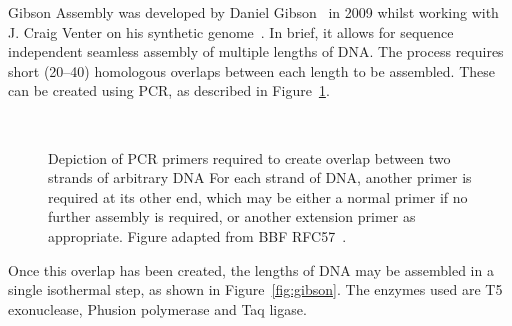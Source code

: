\documentclass[../main.tex]{subfiles}
\begin{document}
Gibson Assembly was developed by Daniel Gibson~\citep{gibson09} in 2009 whilst working with J. Craig Venter on his synthetic genome~\citep{venter10}. In brief, it allows for sequence independent seamless assembly of multiple lengths of DNA. The process requires short (\SIrange{20}{40}{\base}) homologous overlaps between each length to be assembled. These can be created using PCR, as described in Figure~\ref{fig:gibsonPCR}.
\begin{figure}[p]
\\
\caption[Primer design for Gibson Assembly]{Depiction of PCR primers required to create overlap between two strands of arbitrary DNA For each strand of DNA, another primer is required at its other end, which may be either a normal primer if no further assembly is required, or another extension primer as appropriate. Figure adapted from BBF RFC57~\citep{rfc57}.}
\label{fig:gibsonPCR}
\end{figure}

Once this overlap has been created, the lengths of DNA may be assembled in a single isothermal step, as shown in Figure~\ref{fig:gibson}. The enzymes used are T5 exonuclease, Phusion\textregistered\xspace polymerase and Taq ligase. 
\end{document}
